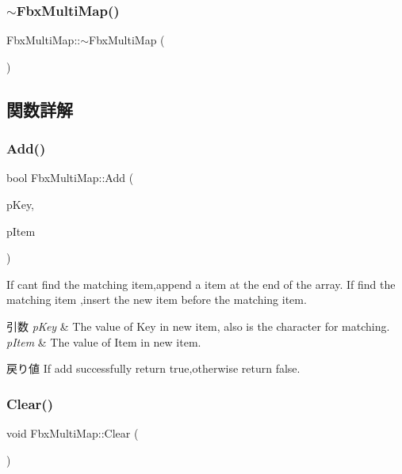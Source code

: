 \subsubsection{\texorpdfstring{$\sim$\+Fbx\+Multi\+Map()}{~FbxMultiMap()}}
{\footnotesize\ttfamily Fbx\+Multi\+Map\+::$\sim$\+Fbx\+Multi\+Map (\begin{DoxyParamCaption}{ }\end{DoxyParamCaption})}



\subsection{関数詳解}
\mbox{\label{class_fbx_multi_map_af2a311d7518a76cf06ac5f2ce84d597a}} 
\subsubsection{\texorpdfstring{Add()}{Add()}}
{\footnotesize\ttfamily bool Fbx\+Multi\+Map\+::\+Add (\begin{DoxyParamCaption}\item[{Fbx\+Handle}]{p\+Key,  }\item[{Fbx\+Handle}]{p\+Item }\end{DoxyParamCaption})}

If can\textquotesingle{}t find the matching item,append a item at the end of the array. If find the matching item ,insert the new item before the matching item. 
\begin{DoxyParams}{引数}
{\em p\+Key} & The value of Key in new item, also is the character for matching. \\
\hline
{\em p\+Item} & The value of Item in new item. \\
\hline
\end{DoxyParams}
\begin{DoxyReturn}{戻り値}
If add successfully return true,otherwise return false. 
\end{DoxyReturn}
\mbox{\label{class_fbx_multi_map_add121708bf4b592eecf823eee98ed841}} 
\subsubsection{\texorpdfstring{Clear()}{Clear()}}
{\footnotesize\ttfamily void Fbx\+Multi\+Map\+::\+Clear (\begin{DoxyParamCaption}{ }\end{DoxyParamCaption})}



